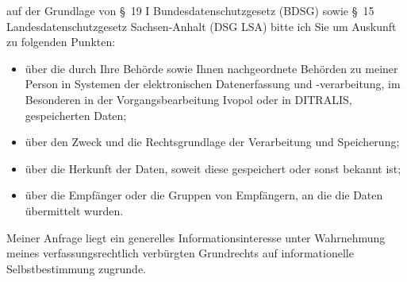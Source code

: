 auf der Grundlage von §~19 I Bundesdatenschutzgesetz (BDSG) sowie
§~15 Landesdatenschutzgesetz Sachsen-Anhalt (DSG LSA) bitte ich Sie um Auskunft
zu folgenden Punkten:

\begin{itemize}
  \item über die durch Ihre Behörde sowie Ihnen nachgeordnete Behörden zu meiner
  Person in Systemen der elektronischen Datenerfassung und -verarbeitung, im Besonderen
  in der Vorgangsbearbeitung Ivopol oder in DITRALIS, gespeicherten Daten;

  \item über den Zweck und die Rechtsgrundlage der Verarbeitung und Speicherung;

  \item über die Herkunft der Daten, soweit diese gespeichert oder sonst bekannt ist;

  \item über die Empfänger oder die Gruppen von Empfängern, an die die Daten übermittelt wurden.
\end{itemize}

Meiner Anfrage liegt ein generelles Informationsinteresse unter Wahrnehmung
meines verfassungsrechtlich verbürgten Grundrechts auf informationelle
Selbstbestimmung zugrunde.
